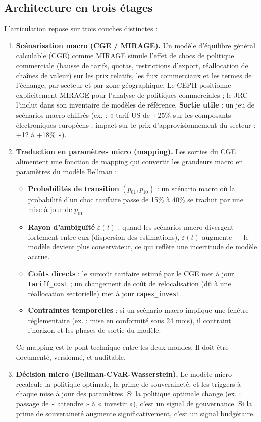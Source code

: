 \documentclass[11pt,a4paper]{article}
\begin{document}
\subsection{Architecture en trois étages}
L’articulation repose sur trois couches distinctes :

\begin{enumerate}
\item \textbf{Scénarisation macro (CGE / MIRAGE).}
Un modèle d’équilibre général calculable (CGE) comme MIRAGE \citep{mirageSite,mirageDoc2026,mirageJRC} simule l’effet de chocs de politique commerciale (hausse de tarifs, quotas, restrictions d’export, réallocation de chaînes de valeur) sur les prix relatifs, les flux commerciaux et les termes de l’échange, par secteur et par zone géographique.
Le CEPII positionne explicitement MIRAGE pour l’analyse de politiques commerciales ; le JRC l’inclut dans son inventaire de modèles de référence.
\textbf{Sortie utile} : un jeu de scénarios macro chiffrés (ex. : « tarif US de +25\% sur les composants électroniques européens ; impact sur le prix d’approvisionnement du secteur : +12 à +18\% »).

\item \textbf{Traduction en paramètres micro (mapping).}
Les sorties du CGE alimentent une fonction de mapping qui convertit les grandeurs macro en paramètres du modèle Bellman :
\begin{itemize}
\item \textbf{Probabilités de transition} \((p_{01}, p_{10})\) : un scénario macro où la probabilité d’un choc tarifaire passe de 15\% à 40\% se traduit par une mise à jour de \(p_{01}\).
\item \textbf{Rayon d’ambiguïté} \(\varepsilon(t)\) : quand les scénarios macro divergent fortement entre eux (dispersion des estimations), \(\varepsilon(t)\) augmente — le modèle devient plus conservateur, ce qui reflète une incertitude de modèle accrue.
\item \textbf{Coûts directs} : le surcoût tarifaire estimé par le CGE met à jour \texttt{tariff\_cost} ; un changement de coût de relocalisation (dû à une réallocation sectorielle) met à jour \texttt{capex\_invest}.
\item \textbf{Contraintes temporelles} : si un scénario macro implique une fenêtre réglementaire (ex. : mise en conformité sous 24 mois), il contraint l’horizon et les phases de sortie du modèle.
\end{itemize}
Ce mapping est le pont technique entre les deux mondes. Il doit être documenté, versionné, et auditable.

\item \textbf{Décision micro (Bellman-CVaR-Wasserstein).}
Le modèle micro recalcule la politique optimale, la prime de souveraineté, et les triggers à chaque mise à jour des paramètres.
Si la politique optimale change (ex. : passage de « attendre » à « investir »), c’est un signal de gouvernance.
Si la prime de souveraineté augmente significativement, c’est un signal budgétaire.
\end{enumerate}
\end{document}
